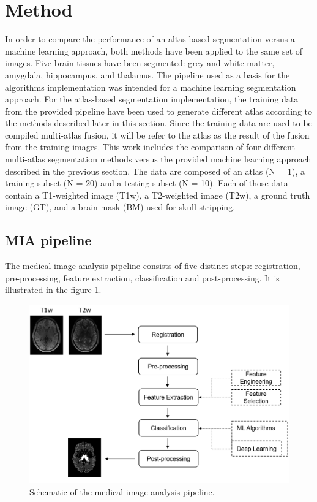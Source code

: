 \section*{Method}
In order to compare the performance of an altas-based segmentation versus a machine learning approach, both methods have been applied to the same set of images. Five brain tissues have been segmented: grey and white matter, amygdala, hippocampus, and thalamus. 
The pipeline used as a basis for the algorithms implementation was intended for a machine learning segmentation approach. For the atlas-based segmentation implementation, the training data from the provided pipeline have been used to generate different atlas according to the methods described later in this section. Since the training data are used to be compiled multi-atlas fusion, it will be refer to the atlas as the result of the fusion from the training images. This work includes the comparison of four different multi-atlas segmentation methods versus the provided machine learning approach described in the previous section.
The data are composed of an atlas (N = 1), a training subset (N = 20) and a testing subset (N = 10). Each of those data contain a T1-weighted image (T1w), a T2-weighted image (T2w), a ground truth image (GT), and a brain mask (BM) used for skull stripping.

\subsection*{MIA pipeline} \label{sec:MIApipeline}
The medical image analysis pipeline consists of five distinct steps: registration, pre-processing, feature extraction, classification and post-processing. It is illustrated in the figure \ref{fig:pipeline}.

\begin{figure}[h!]
	\centering
	\includegraphics[width = .45 \textwidth]{img/pipeline2}
	\caption{Schematic of the medical image analysis pipeline.}
	\label{fig:pipeline}
\end{figure}

